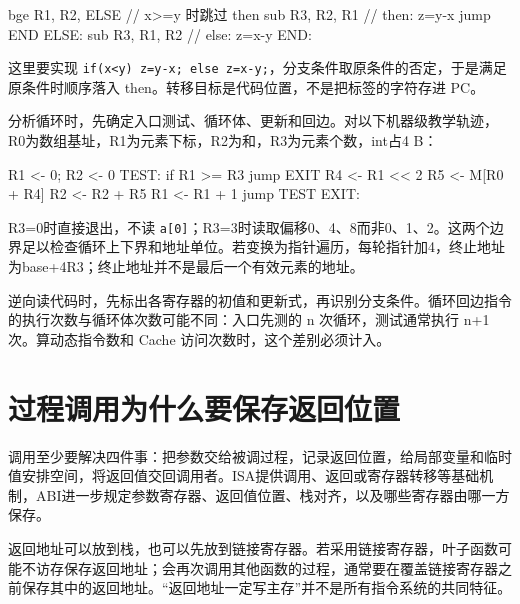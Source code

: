 \par\medskip\noindent\begin{minipage}{\linewidth}
\begin{codeblock}[language={}]
    bge R1, R2, ELSE     // x>=y 时跳过 then
    sub R3, R2, R1      // then: z=y-x
    jump END
ELSE:
    sub R3, R1, R2      // else: z=x-y
END:
\end{codeblock}
\end{minipage}\par\medskip

这里要实现 \texttt{if(\allowbreak{}x<\allowbreak{}y)\allowbreak{} z=\allowbreak{}y-x;\allowbreak{} else z=\allowbreak{}x-y;\allowbreak{}}，分支条件取原条件的否定，于是满足原条件时顺序落入 then。转移目标是代码位置，不是把标签的字符存进 PC。

分析循环时，先确定入口测试、循环体、更新和回边。对以下机器级教学轨迹，R0为数组基址，R1为元素下标，R2为和，R3为元素个数，int占4 B：

\par\medskip\noindent\begin{minipage}{\linewidth}
\begin{codeblock}[language={}]
    R1 <- 0; R2 <- 0
TEST:
    if R1 >= R3 jump EXIT
    R4 <- R1 << 2
    R5 <- M[R0 + R4]
    R2 <- R2 + R5
    R1 <- R1 + 1
    jump TEST
EXIT:
\end{codeblock}
\end{minipage}\par\medskip

R3=0时直接退出，不读 \texttt{a[\allowbreak{}0]\allowbreak{}}；R3=3时读取偏移0、4、8而非0、1、2。这两个边界足以检查循环上下界和地址单位。若变换为指针遍历，每轮指针加4，终止地址为base+4R3；终止地址并不是最后一个有效元素的地址。

逆向读代码时，先标出各寄存器的初值和更新式，再识别分支条件。循环回边指令的执行次数与循环体次数可能不同：入口先测的 n 次循环，测试通常执行 n+1次。算动态指令数和 Cache 访问次数时，这个差别必须计入。

\section{过程调用为什么要保存返回位置}\label{CO04-12}

调用至少要解决四件事：把参数交给被调过程，记录返回位置，给局部变量和临时值安排空间，将返回值交回调用者。ISA提供调用、返回或寄存器转移等基础机制，ABI进一步规定参数寄存器、返回值位置、栈对齐，以及哪些寄存器由哪一方保存。

返回地址可以放到栈，也可以先放到链接寄存器。若采用链接寄存器，叶子函数可能不访存保存返回地址；会再次调用其他函数的过程，通常要在覆盖链接寄存器之前保存其中的返回地址。``返回地址一定写主存''并不是所有指令系统的共同特征。

